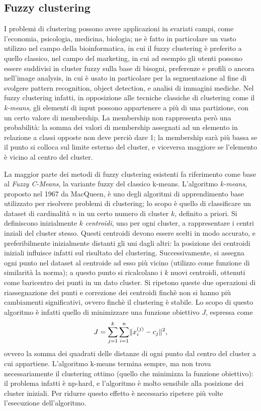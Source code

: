 \documentclass[oneside, openany]{book}
\DeclarePairedDelimiter{\norma}{\lVert}{\rVert}
\begin{document}
	\subsection{Fuzzy clustering}
		I problemi di clustering possono avere applicazioni in svariati campi, come l'economia, psicologia, medicina, biologia; ne è fatto in particolare un vasto utilizzo nel campo della bioinformatica, in cui il fuzzy clustering è preferito a quello classico, nel campo del marketing, in cui ad esempio gli utenti possono essere suddivisi in cluster fuzzy sulla base di bisogni, preferenze e profili o ancora nell'image analysis, in cui è usato in particolare per la segmentazione al fine di svolgere pattern recognition, object detection, e analisi di immagini mediche.
		Nel fuzzy clustering infatti, in opposizione alle tecniche classiche di clustering come il \textit{k-means}, gli elementi di input possono appartenere a più di una partizione, con un certo valore di membership. La membership non rappresenta però una probabilità: la somma dei valori di membership assegnati ad un elemento in relazione a classi opposte non deve perciò dare 1; la membership sarà più bassa se il punto si colloca sul limite esterno del cluster, e viceversa maggiore se l'elemento è vicino al centro del cluster.
		
		La maggior parte dei metodi di fuzzy clustering esistenti fa riferimento come base al \textit{Fuzzy C-Means}, la variante fuzzy del classico k-means. L'algoritmo \textit{k-means}, proposto nel 1967 da MacQueen, è uno degli algoritmi di apprendimento base utilizzato per risolvere problemi di clustering; lo scopo è quello di classificare un dataset di cardinalità $n$ in un certo numero di cluster $k$, definito a priori.
		Si definiscono inizialmente $k$ \textit{centroidi}, uno per ogni cluster, a rappresentare i centri inziali del cluster stesso. Questi centroidi devono essere scelti in modo accurato, e preferibilmente inizialmente distanti gli uni dagli altri: la posizione dei centroidi iniziali influisce infatti sul risultato del clustering. Successivamente, si assegna ogni punto nel dataset al centroide ad esso più vicino (utilizzo come funzione di similarità la norma); a questo punto si ricalcolano i $k$ nuovi centroidi, ottenuti come baricentro dei punti in un dato cluster. Si ripetono queste due operazioni di riassegnazione dei punti e correzione dei centroidi finchè non si hanno più cambiamenti significativi, ovvero finchè il clustering è stabile. Lo scopo di questo algoritmo è infatti quello di minimizzare una funzione obiettivo $J$, espressa come
		\[
			J = \sum_{j=1}^{k}\sum_{i=1}^{n}\norma{x_i^{(j)}-c_j}^2\text{,}
		\]
		ovvero la somma dei quadrati delle distanze di ogni punto dal centro del cluster a cui appartiene. 
		L'algoritmo k-means termina sempre, ma non trova necessariamente il clustering ottimo (quello che minimizza la funzione obiettivo): il problema infatti è np-hard, e l'algoritmo è molto sensibile alla posizione dei cluster iniziali. Per ridurre questo effetto è necessario ripetere più volte l'esecuzione dell'algoritmo.\\
		
\end{document}
